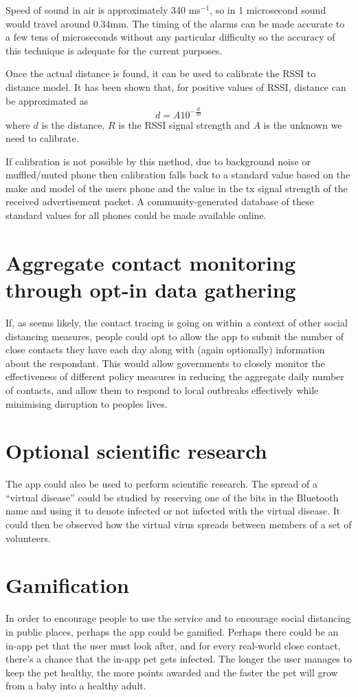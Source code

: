 \documentclass{article}
\begin{document}
Speed of sound in air is approximately 340 ms$^{-1}$, so in 1 microsecond sound would travel around 0.34mm. The timing of the alarms can be made accurate to a few tens of microseconds without any particular difficulty so the accuracy of this technique is adequate for the current purposes.

Once the actual distance is found, it can be used to calibrate the RSSI to distance model. It has been shown\cite{zhou2006position} that, for positive values of RSSI, distance can be approximated as
\[
d = A10^{-\frac{R}{20}}
\]
where $d$ is the distance, $R$ is the RSSI signal strength and $A$ is the unknown we need to calibrate.

If calibration is not possible by this method, due to background noise or muffled/muted phone then calibration falls back to a standard value based on the make and model of the users phone and the value in the tx signal strength of the received advertisement packet. A community-generated database of these standard values for all phones could be made available online.

\section{Aggregate contact monitoring through opt-in data gathering}

If, as seems likely, the contact tracing is going on within a context of other social distancing measures, people could opt to allow the app to submit the number of close contacts they have each day along with (again optionally) information about the respondant. This would allow governments to closely monitor the effectiveness of different policy measures in reducing the aggregate daily number of contacts, and allow them to respond to local outbreaks effectively while minimising disruption to peoples lives.

\section{Optional scientific research}

The app could also be used to perform scientific research. The spread of a ``virtual disease'' could be studied by reserving one of the bits in the Bluetooth name and using it to denote infected or not infected with the virtual disease. It could then be observed how the virtual virus spreads between members of a set of volunteers.

\section{Gamification}

In order to encourage people to use the service and to encourage social distancing in public places, perhaps the app could be gamified. Perhaps there could be an in-app pet that the user must look after, and for every real-world close contact, there's a chance that the in-app pet gets infected. The longer the user manages to keep the pet healthy, the more points awarded and the faster the pet will grow from a baby into a healthy adult.


%
% 


\end{document}
